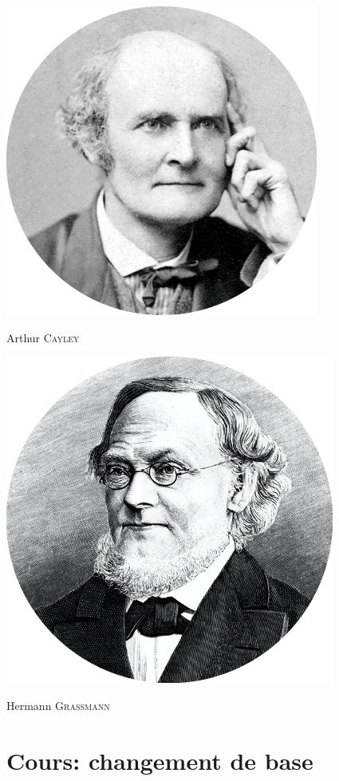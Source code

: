 \begin{marginfigure}[-13cm]
    \includegraphics{images/arthur_cayley.png}
    \caption{Arthur \textsc{Cayley}}
\end{marginfigure}

\begin{marginfigure}[-6cm]
    \includegraphics{images/hermann_grassmann.png}
    \caption{Hermann \textsc{Grassmann}}
\end{marginfigure}

\newpage

\section{Cours: changement de base}



